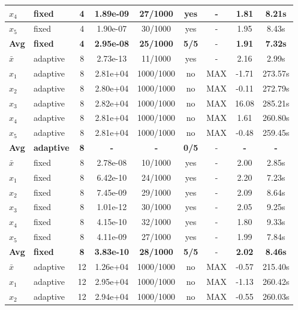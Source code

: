 \begin{longtable}{|l|l|c|c|c|c|c|c|c|}
\hline
$x_4$ & fixed & 4 & 1.89e-09 & 27/1000 & yes & - & 1.81 & 8.21s \\
\hline
$x_5$ & fixed & 4 & 1.90e-07 & 30/1000 & yes & - & 1.95 & 8.43s \\
\hline
\hline\hline
\textbf{Avg} & \textbf{fixed} & \textbf{4} & \textbf{2.95e-08} & \textbf{25/1000} & \textbf{5/5} & - & \textbf{1.91} & \textbf{7.32s} \\
\hline\hline
$\bar{x}$ & adaptive & 8 & 2.73e-13 & 11/1000 & yes & - & 2.16 & 2.99s \\
\hline
$x_1$ & adaptive & 8 & 2.81e+04 & 1000/1000 & no & MAX & -1.71 & 273.57s \\
\hline
$x_2$ & adaptive & 8 & 2.80e+04 & 1000/1000 & no & MAX & -0.11 & 272.79s \\
\hline
$x_3$ & adaptive & 8 & 2.82e+04 & 1000/1000 & no & MAX & 16.08 & 285.21s \\
\hline
$x_4$ & adaptive & 8 & 2.81e+04 & 1000/1000 & no & MAX & 1.61 & 260.80s \\
\hline
$x_5$ & adaptive & 8 & 2.81e+04 & 1000/1000 & no & MAX & -0.48 & 259.45s \\
\hline
\hline\hline
\textbf{Avg} & \textbf{adaptive} & \textbf{8} & \textbf{-} & \textbf{-} & \textbf{0/5} & - & \textbf{-} & \textbf{-} \\
\hline\hline
\hline
$\bar{x}$ & fixed & 8 & 2.78e-08 & 10/1000 & yes & - & 2.00 & 2.85s \\
\hline
$x_1$ & fixed & 8 & 6.42e-10 & 24/1000 & yes & - & 2.20 & 7.23s \\
\hline
$x_2$ & fixed & 8 & 7.45e-09 & 29/1000 & yes & - & 2.09 & 8.64s \\
\hline
$x_3$ & fixed & 8 & 1.01e-12 & 30/1000 & yes & - & 2.05 & 9.25s \\
\hline
$x_4$ & fixed & 8 & 4.15e-10 & 32/1000 & yes & - & 1.80 & 9.33s \\
\hline
$x_5$ & fixed & 8 & 4.11e-09 & 27/1000 & yes & - & 1.99 & 7.84s \\
\hline
\hline\hline
\textbf{Avg} & \textbf{fixed} & \textbf{8} & \textbf{3.83e-10} & \textbf{28/1000} & \textbf{5/5} & - & \textbf{2.02} & \textbf{8.46s} \\
\hline\hline
$\bar{x}$ & adaptive & 12 & 1.26e+04 & 1000/1000 & no & MAX & -0.57 & 215.40s \\
\hline
$x_1$ & adaptive & 12 & 2.95e+04 & 1000/1000 & no & MAX & -1.13 & 260.42s \\
\hline
$x_2$ & adaptive & 12 & 2.94e+04 & 1000/1000 & no & MAX & -0.55 & 260.03s \\

\end{longtable}

